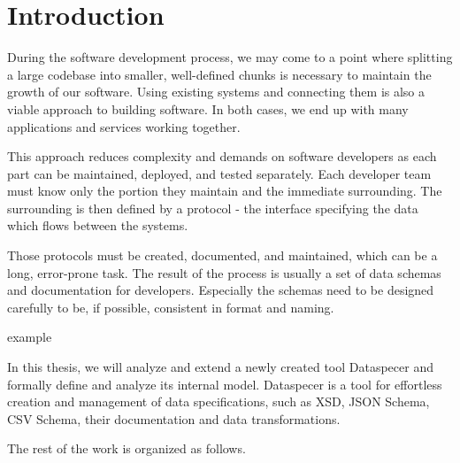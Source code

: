 \chapter*{Introduction}

During the software development process, we may come to a point where splitting a large codebase into smaller, well-defined chunks is necessary to maintain the growth of our software. Using existing systems and connecting them is also a viable approach to building software. In both cases, we end up with many applications and services working together.

This approach reduces complexity and demands on software developers as each part can be maintained, deployed, and tested separately. Each developer team must know only the portion they maintain and the immediate surrounding. The surrounding is then defined by a protocol - the interface specifying the data which flows between the systems.

Those protocols must be created, documented, and maintained, which can be a long, error-prone task. The result of the process is usually a set of data schemas and documentation for developers. Especially the schemas need to be designed carefully to be, if possible, consistent in format and naming.

\bigskip

example

\bigskip

In this thesis, we will analyze and extend a newly created tool Dataspecer \cite{dataspecer} and formally define and analyze its internal model. Dataspecer is a tool for effortless creation and management of data specifications, such as XSD, JSON Schema, CSV Schema, their documentation and data transformations.

\bigskip

\noindent The rest of the work is organized as follows.


